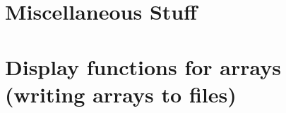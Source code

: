\documentclass{article}
\begin{document}
\vfill\eject
\section{Miscellaneous Stuff}


\vfill\eject


\vfill\eject


\vfill\eject


\vfill\eject
\section{Display functions for arrays (writing arrays to files)}


\vfill\eject


\vfill\eject


\vfill\eject


\vfill\eject




\printindex
\end{document}

